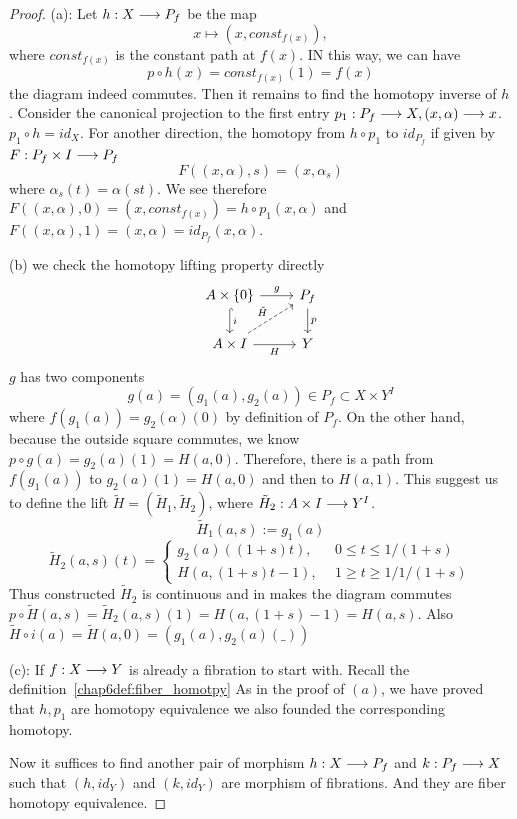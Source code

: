 \documentclass[11pt]{book} %
\begin{document}
\begin{proof}
(a): Let $h: X\longrightarrow P_f$ be the map
$$
x\mapsto (x,const_{f(x)}),
$$
where $const_{f(x)}$  is the constant path at $f(x)$. IN this way, we can have 
$$
p\circ h(x)=const_{f(x)}(1)=f(x)
$$
 the diagram indeed commutes. Then it remains to find the homotopy inverse of $h$. Consider the canonical projection to the first entry
 $p_1: P_f\longrightarrow X, (x,\alpha)\longrightarrow x$. $p_1\circ h=id_X$. For another direction, the homotopy from $h\circ p_1$ to $id_{P_f}$ if given by $F: P_f\times I\longrightarrow P_f$
 $$
 F((x,\alpha),s)
 =(x,\alpha_s)
 $$
 where $\alpha_s(t)=\alpha(st).$ We see therefore $F((x,\alpha),0)=(x, const_{f(x)})=h\circ p_1(x,\alpha)$ and $F((x,\alpha),1)=(x,\alpha)=id_{P_f}(x,\alpha)$.

 (b) we check the homotopy lifting property directly
$$
\begin{tikzcd}
A\times\{0\} \arrow[r, "g"] \arrow[d, "i", hook] & P_f \arrow[d, "p"] \\
A\times I \arrow[r, "H"'] \arrow[ru, "\tilde{H}", dashed] & Y
\end{tikzcd}
$$
$g$ has two components
$$
g(a)=(g_1(a),g_2(a))\in P_f\subset  X\times Y^I
$$
 where $f(g_1(a))=g_2(\alpha)(0)$ by definition of $P_f$. On the other hand, because the outside square commutes, we know $p\circ g(a)=g_2(a)(1)=H(a,0)$. Therefore, there is a path from $f(g_1(a))$ to $g_2(a)(1)=H(a,0)$ and then to $H(a,1)$. This suggest us to define the lift $\tilde{H}=(\tilde{H}_1,\tilde{H}_2)$, where $\tilde{H}_2: A\times I\longrightarrow Y^I$.
 $$
\tilde{H}_1(a,s):= g_1(a)
 $$
 $$
\tilde{H}_2(a,s)(t)=\left\{\begin{aligned}
g_2(a)((1+s) t), &\ \  0\leq t\leq 1/(1+s)\\
H(a,(1+s)t-1), &\ \  1\geq t\geq 1/1/(1+s)
\end{aligned}\right.
 $$
 Thus constructed $\tilde{H}_2$ is continuous and in makes the diagram commutes
 $p\circ \tilde{H}(a,s)=\tilde{H}_2(a,s)(1)=H(a,(1+s)-1)=H(a,s)$. Also $\tilde{H}\circ i(a)=\tilde{H}(a,0)=(g_1(a), g_2(a)(\_))$

 (c): If $f: X\longrightarrow Y$ is already a fibration to start with. Recall the definition~\ref{chap6def:fiber_homotpy} As in the proof of $(a)$, we have proved that $h,p_1$ are homotopy equivalence we also founded the corresponding homotopy. 

 Now it suffices to find another pair of morphism $h: X\longrightarrow P_f$ and $k: P_f\longrightarrow X$ such that $(h, id_Y)$ and $(k,id_Y)$ are morphism of fibrations. And they are fiber homotopy equivalence.


\end{proof}
\end{document}
